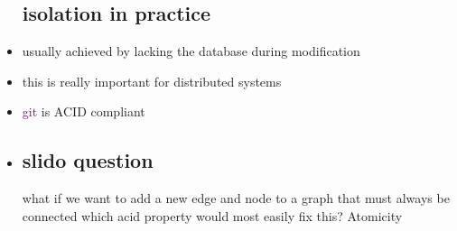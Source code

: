 \documentclass{article}
\begin{document}
\begin{itemize}
\subsection*{isolation in practice}
\item usually achieved by lacking the database during modification
\item this is really important for distributed systems 
\item \textcolor{purple}{git } is ACID compliant
\item \subsection*{slido question} what if we want to add a new edge and node to a graph that must always be connected which acid property would most easily fix this? Atomicity
\end{itemize}
\end{document}
